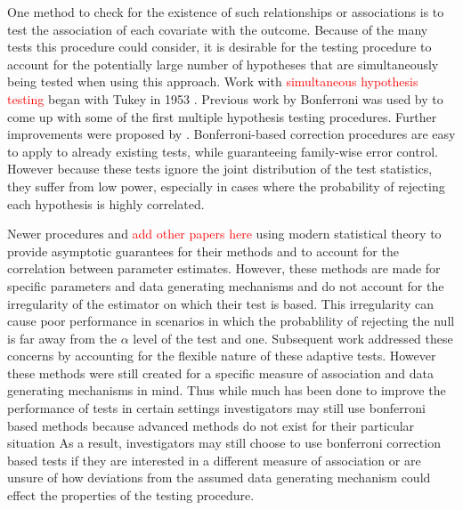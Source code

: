 \documentclass{article}
\newcommand{\sh}{\textcolor{red}}
\begin{document}
One method to check for the existence of such relationships or associations is to test the association of each covariate with the outcome. Because of the many tests this procedure could consider, it is desirable for the testing procedure to account for the potentially large number of hypotheses that are simultaneously being tested when using this approach. Work with \textcolor{red}{simultaneous hypothesis testing}
began with Tukey in 1953 \citep{miller_simultaneous_1981}.  Previous work by Bonferroni was used by \citep{dunn_estimation_1959,dunn_multiple_1961} to come up with some of the first multiple hypothesis testing procedures.  Further improvements were proposed by \citep{hochberg_sharper_1988,holm_simple_1979,s._holland_improved_1988}.  Bonferroni-based correction procedures are easy to apply to already existing tests, while guaranteeing family-wise error control. However because these tests ignore the joint distribution of the test statistics, they suffer from low power, especially in cases where the probability of rejecting each hypothesis is highly correlated. 

Newer procedures \citep{donoho_higher_2004} and \sh{add other papers here} using modern statistical theory to provide asymptotic guarantees for their methods and to account for the correlation between parameter estimates.  However, these methods are made for specific parameters and data generating mechanisms and do not account for the irregularity of the estimator on which their test is based. This irregularity can cause poor performance in scenarios in which the probablility of rejecting the null is far away from the $\alpha$ level of the test and one.  Subsequent work \citep{mckeague_adaptive_2015, pan_powerful_2014, xu_adaptive_2016} addressed these concerns by accounting for the flexible nature of these adaptive tests.  However these methods were still created for a specific measure of association and data generating mechanisms in mind. Thus while much has been done to improve the performance of tests in certain settings investigators may still use bonferroni based methods because advanced methods do not exist for their particular situation  As a result, investigators may still choose to use bonferroni correction based tests if they are interested in a different measure of association or are unsure of how deviations from the assumed data generating mechanism could effect the properties of the testing procedure. 
\end{document}
